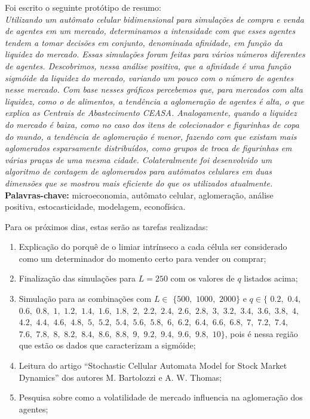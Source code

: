\documentclass[12pt,a4paper,final]{article}
\begin{document}
  Foi escrito o seguinte protótipo de resumo:\\
  \textit{Utilizando um autômato celular bidimensional para simulações de compra e venda de agentes em um mercado, determinamos a intensidade com que esses agentes tendem a tomar decisões em conjunto, denominada afinidade, em função da liquidez do mercado. Essas simulações foram feitas para vários números diferentes de agentes. Descobrimos, nessa análise positiva, que a afinidade é uma função sigmóide da liquidez do mercado, variando um pouco com o número de agentes nesse mercado. Com base nesses gráficos percebemos que, para mercados com alta liquidez, como o de alimentos, a tendência a aglomeração de agentes é alta, o que explica as Centrais de Abastecimento CEASA. Analogamente, quando a liquidez do mercado é baixa, como no caso dos itens de colecionador e figurinhas de copa do mundo, a tendência de aglomeração é menor, fazendo com que existam mais aglomerados esparsamente distribuídos, como grupos de troca de figurinhas em várias praças de uma mesma cidade. Colateralmente foi desenvolvido um algoritmo de contagem de aglomerados para autômatos celulares em duas dimensões que se mostrou mais eficiente do que os utilizados atualmente.}\\ \textbf{Palavras-chave:} microeconomia, autômato celular, aglomeração, análise positiva, estocasticidade, modelagem, econofísica.

  Para os próximos dias, estas serão as tarefas realizadas:
  \begin{enumerate}
    \item Explicação do porquê de o limiar intrínseco a cada célula ser considerado como um determinador do momento certo para vender ou comprar;
    \item Finalização das simulações para $L = 250$ com os valores de $q$ listados acima;
    \item Simulação para as combinações com $L \in$ $\{ 500,$ $1000,$ $2000\}$ e $q\in\{$ 
    $0.2,$ $0.4,$ $0.6,$ $0.8,$ $1,$ 
    $1.2,$ $1.4,$ $1.6,$ $1.8,$ $2,$ 
    $2.2,$ $2.4,$ $2.6,$ $2.8,$ $3,$
    $3.2,$ $3.4,$ $3.6,$ $3.8,$ $4,$
    $4.2,$ $4.4,$ $4.6,$ $4.8,$ $5,$
    $5.2,$ $5.4,$ $5.6,$ $5.8,$ $6,$
    $6.2,$ $6.4,$ $6.6,$ $6.8,$ $7,$ 
    $7.2,$ $7.4,$ $7.6,$ $7.8,$ $8,$
    $8.2,$ $8.4,$ $8.6,$ $8.8,$ $9,$ 
    $9.2,$ $9.4,$ $9.6,$ $9.8,$ $10\}$, pois é nessa região que estão os dados que caracterizam a sigmóide;
		\item Leitura do artigo ``Stochastic Cellular Automata Model for Stock Market Dynamics'' dos autores M. Bartolozzi e A. W. Thomas;
		\item Pesquisa sobre como a volatilidade de mercado influencia na aglomeração dos agentes;
	\end{enumerate}
\end{document}
